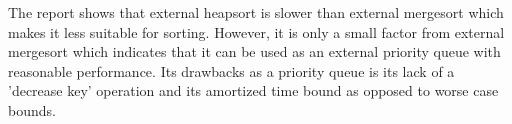 The report shows that external heapsort is slower than external mergesort which makes it less suitable for sorting. 
However, it is only a small factor from external mergesort which indicates that it can be used as an external priority queue with reasonable performance. Its drawbacks as a priority queue is its lack of a 'decrease key' operation and its amortized time bound as opposed to worse case bounds.

